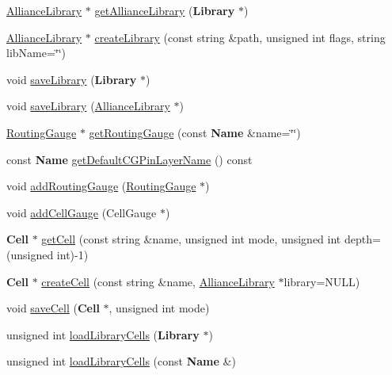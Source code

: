 \begin{DoxyCompactItemize}
\hyperlink{classCRL_1_1AllianceLibrary}{Alliance\-Library} $\ast$ \hyperlink{classCRL_1_1AllianceFramework_a8e007b3f2ac45feec2907f77530a718c}{get\-Alliance\-Library} ({\bf Library} $\ast$)
\item 
\hyperlink{classCRL_1_1AllianceLibrary}{Alliance\-Library} $\ast$ \hyperlink{classCRL_1_1AllianceFramework_a4efc06e6a6d5413398946453c3fd6649}{create\-Library} (const string \&path, unsigned int flags, string lib\-Name=\char`\"{}\char`\"{})
\item 
void \hyperlink{classCRL_1_1AllianceFramework_a5e5a3d137a2c141bf8984877b7f7d18a}{save\-Library} ({\bf Library} $\ast$)
\item 
void \hyperlink{classCRL_1_1AllianceFramework_afe7a103d54e865511fd55af90eddcf4e}{save\-Library} (\hyperlink{classCRL_1_1AllianceLibrary}{Alliance\-Library} $\ast$)
\item 
\hyperlink{classCRL_1_1RoutingGauge}{Routing\-Gauge} $\ast$ \hyperlink{classCRL_1_1AllianceFramework_ae102d655820c5d0a29a0200c5e83d42c}{get\-Routing\-Gauge} (const {\bf Name} \&name=\char`\"{}\char`\"{})
\item 
const {\bf Name} \hyperlink{classCRL_1_1AllianceFramework_aa584786d09bbb2469923a181b6f8e0d4}{get\-Default\-C\-G\-Pin\-Layer\-Name} () const 
\item 
void \hyperlink{classCRL_1_1AllianceFramework_ae182fd150c695fd24c1b10ddbc377b32}{add\-Routing\-Gauge} (\hyperlink{classCRL_1_1RoutingGauge}{Routing\-Gauge} $\ast$)
\item 
void \hyperlink{classCRL_1_1AllianceFramework_aab16db33a0ce2e3bce5739f7cadb3d5a}{add\-Cell\-Gauge} (Cell\-Gauge $\ast$)
\item 
{\bf Cell} $\ast$ \hyperlink{classCRL_1_1AllianceFramework_a5f0b56b303c51af5ea5c1eb1096786dd}{get\-Cell} (const string \&name, unsigned int mode, unsigned int depth=(unsigned int)-\/1)
\item 
{\bf Cell} $\ast$ \hyperlink{classCRL_1_1AllianceFramework_ac4381ad0c3799d584ef3ea160846e2bb}{create\-Cell} (const string \&name, \hyperlink{classCRL_1_1AllianceLibrary}{Alliance\-Library} $\ast$library=N\-U\-L\-L)
\item 
void \hyperlink{classCRL_1_1AllianceFramework_abb34a606c7cd21638b4439701a8dcef9}{save\-Cell} ({\bf Cell} $\ast$, unsigned int mode)
\item 
unsigned int \hyperlink{classCRL_1_1AllianceFramework_a2e43b1928a05eea4b2dc1fe0757e4865}{load\-Library\-Cells} ({\bf Library} $\ast$)
\item 
unsigned int \hyperlink{classCRL_1_1AllianceFramework_adc8acedeb9daa37b4ab2dee0717835fa}{load\-Library\-Cells} (const {\bf Name} \&)
\end{DoxyCompactItemize}

